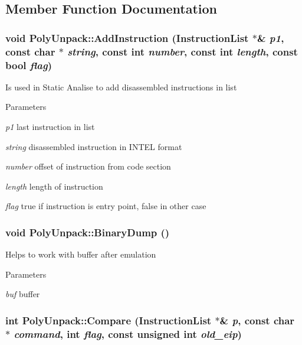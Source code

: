 \subsection{Member Function Documentation}
\hypertarget{classPolyUnpack_a9fba41c1e0852210e7ac0eddeeba843d}{
\subsubsection[{AddInstruction}]{\setlength{\rightskip}{0pt plus 5cm}void PolyUnpack::AddInstruction ({\bf InstructionList} $\ast$\& {\em p1}, \/  const char $\ast$ {\em string}, \/  const int {\em number}, \/  const int {\em length}, \/  const bool {\em flag})}}
\label{classPolyUnpack_a9fba41c1e0852210e7ac0eddeeba843d}
Is used in Static Analise to add disassembled instructions in list 
\begin{DoxyParams}{Parameters}
\item[{\em p1}]last instruction in list \item[{\em string}]disassembled instruction in INTEL format \item[{\em number}]offset of instruction from code section \item[{\em length}]length of instruction \item[{\em flag}]true if instruction is entry point, false in other case \end{DoxyParams}
\hypertarget{classPolyUnpack_a1eda34787a9b8633621a6b28fd86df78}{
\subsubsection[{BinaryDump}]{\setlength{\rightskip}{0pt plus 5cm}void PolyUnpack::BinaryDump ()}}
\label{classPolyUnpack_a1eda34787a9b8633621a6b28fd86df78}
Helps to work with buffer after emulation 
\begin{DoxyParams}{Parameters}
\item[{\em buf}]buffer \end{DoxyParams}
\hypertarget{classPolyUnpack_a70dca9f1f731890af945b5070d9bdb0b}{
\subsubsection[{Compare}]{\setlength{\rightskip}{0pt plus 5cm}int PolyUnpack::Compare ({\bf InstructionList} $\ast$\& {\em p}, \/  const char $\ast$ {\em command}, \/  int {\em flag}, \/  const unsigned int {\em old\_\-eip})}}
